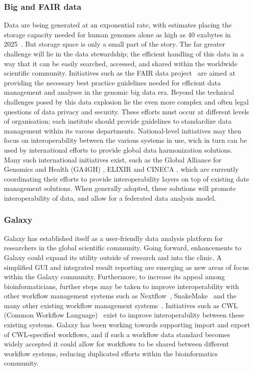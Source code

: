 \subsubsection{Big and FAIR data}
Data are being generated at an exponential rate, with estimates placing the storage capacity needed for human genomes alone as high as 40 exabytes in 2025~\cite{stephens2015}.
But storage space is only a small part of the story. The far greater challenge will lie in the data stewardship; the efficient handling of this data in a way that it can be easily searched, accessed, and shared within the worldwide scientific community.
Initiatives such as the FAIR data project~\cite{wilkinson2016fair} are aimed at providing the necessary best practice guidelines needed for efficient data management and analyses in the genomic big data era. Beyond the technical challenges posed by this data explosion lie the even more complex and often legal questions of data privacy and security.
These efforts must occur at different levels of organisation; each institute should provide guidelines to standardize data management within its varous departments. National-level initiatives may then focus on interoperability between the various systems in use, wich in turn can be used by international efforts to provide global data harmonization solutions.
Many such international initiatives exist, such as the Global Alliance for Genomics and Health (GA4GH) \cite{ga4gh}, ELIXIR \cite{elixir} and CINECA \cite{cineca}, which are currently coordinating their efforts to provide interoperability layers on top of existing date management solutions.
When generally adopted, these solutions will promote interoperability of data, and allow for a federated data analysis model.


\subsubsection{Galaxy}
Galaxy has established itself as a user-friendly data analysis platform for researchers in the global scientific community. Going forward, enhancements to Galaxy could expand its utility outside of research and into the clinic. A simplified GUI and integrated result reporting are emerging as new areas of focus within the Galaxy community.
Furthermore, to increase its appeal among bioinformaticians, further steps may be taken to improve interoperability with other workflow management systems such as Nextflow~\cite{di2017nextflow}, SnakeMake~\cite{koster2012snakemake} and the many other existing workflow management systems~\cite{workflow-engines}.
Initiatives such as CWL (Common Workflow Language)~\cite{amstutz2016common} exist to improve interoperability between these existing systems. Galaxy has been working towards supporting import and export of CWL-specified workflows, and if such a workflow data standard becomes widely accepted it could allow for workflows to be shared between different workflow systems, reducing duplicated efforts within the bioinformatics community.

